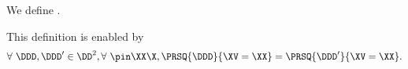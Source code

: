 \begin{definition}
  We define \probdef.%
\end{definition}

\begin{justification}
  This definition is enabled by 
  $$\forall\ \DDD, \DDD' \in \DD^2, \forall\ \pin\XX\X, \PRSQ{\DDD}{\XV = \XX} 
  = 
  \PRSQ{\DDD'}{\XV = \XX}.$$
\end{justification}
